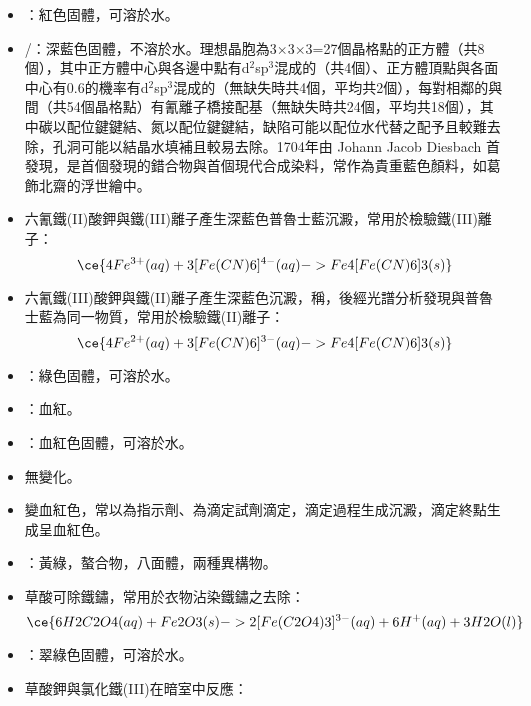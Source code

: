 \documentclass[a4paper,12pt]{report}
\begin{document}
\begin{itemize}
\begin{itemize}
\item {}：紅色固體，可溶於水。
\item {}/：深藍色固體，不溶於水。理想晶胞為3$\times$3$\times$3=27個晶格點的正方體（共8個），其中正方體中心與各邊中點有d$^2$sp$^3$混成的（共4個）、正方體頂點與各面中心有0.6的機率有d$^2$sp$^3$混成的（無缺失時共4個，平均共2個），每對相鄰的與間（共54個晶格點）有氰離子橋接配基（無缺失時共24個，平均共18個），其中碳以配位鍵鍵結、氮以配位鍵鍵結，缺陷可能以配位水代替之配予且較難去除，孔洞可能以結晶水填補且較易去除。1704年由 Johann Jacob Diesbach 首發現，是首個發現的錯合物與首個現代合成染料，常作為貴重藍色顏料，如葛飾北齋的浮世繪中。
\item 六氰鐵(II)酸鉀與鐵(III)離子產生深藍色普魯士藍沉澱，常用於檢驗鐵(III)離子：
\[\ce{4Fe^{3+}(aq) + 3[Fe(CN)6]^{4-}(aq) -> Fe4[Fe(CN)6]3(s)}\]
\item 六氰鐵(III)酸鉀與鐵(II)離子產生深藍色沉澱，稱，後經光譜分析發現與普魯士藍為同一物質，常用於檢驗鐵(II)離子：
\[\ce{4Fe^{2+}(aq) + 3[Fe(CN)6]^{3-}(aq) -> Fe4[Fe(CN)6]3(s)}\]
\eit
{}
\bit
\item {}：綠色固體，可溶於水。
\item {}：血紅。
\item {}：血紅色固體，可溶於水。
\item {}無變化。
\item {}變血紅色，常以為指示劑、為滴定試劑滴定，滴定過程生成沉澱，滴定終點生成呈血紅色。
\eit
{}
\bit
\item {}：黃綠，螯合物，八面體，兩種異構物。
\item 草酸可除鐵鏽，常用於衣物沾染鐵鏽之去除：
\[\ce{6H2C2O4(aq) + Fe2O3(s) -> 2[Fe(C2O4)3]^{3-}(aq) + 6H^+(aq) + 3H2O(l)}\]
\item {}：翠綠色固體，可溶於水。
\item 草酸鉀與氯化鐵(III)在暗室中反應：

\end{itemize}
\end{itemize}
\end{document}
